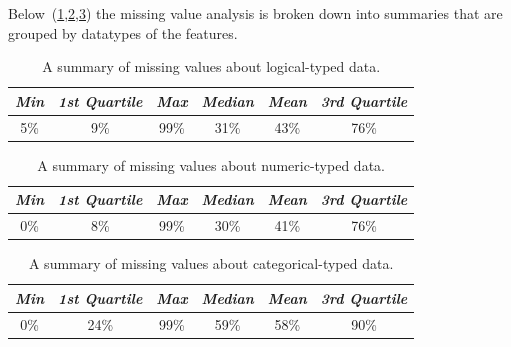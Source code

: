 Below~(\ref{tab:missings-over-logical},\ref{tab:missings-over-numeric},\ref{tab:missings-over-categorical}) the missing value analysis is broken down into summaries that are grouped by datatypes of the features.

 \begin{table}[h!]
  \begin{center}
    \caption{A summary of missing values about logical-typed data.}
    \label{tab:missings-over-logical}
    \begin{tabular}{|c|c|c|c|c|c|}\hline
    \textit{Min} & \textit{1st Quartile}& \textit{Max} & \textit{Median} & \textit{Mean} & \textit{3rd Quartile} \\
      \hline
     5\% & 9\% & 99\% & 31\% & 43\% & 76\% \\ 
     \hline 
    \end{tabular}
  \end{center}
\end{table}
 
 \begin{table}[h!]
  \begin{center}
    \caption{A summary of missing values about numeric-typed data.}
    \label{tab:missings-over-numeric}
    \begin{tabular}{|c|c|c|c|c|c|}\hline
     \textit{Min} & \textit{1st Quartile}& \textit{Max} & \textit{Median} & \textit{Mean} & \textit{3rd Quartile} \\
      \hline
     0\% & 8\% & 99\% & 30\% & 41\% & 76\% \\ 
     \hline 
    \end{tabular}
  \end{center}
\end{table}
   

 \begin{table}[h!]
  \begin{center}
    \caption{A summary of missing values about categorical-typed data.}
    \label{tab:missings-over-categorical}
    \begin{tabular}{|c|c|c|c|c|c|}\hline
      \textit{Min} & \textit{1st Quartile}& \textit{Max} & \textit{Median} & \textit{Mean} & \textit{3rd Quartile} \\
      \hline
     0\% & 24\% & 99\% & 59\% & 58\% & 90\% \\ 
     \hline 
    \end{tabular}
  \end{center}
\end{table}

